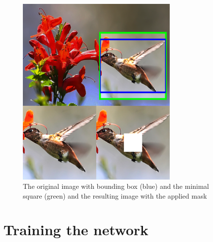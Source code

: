 \documentclass[conference]{IEEEtran}
\begin{document}
\begin{figure}[H]
  \centering
  \includegraphics[width=80mm, keepaspectratio]{figures/preparation.png}
  \caption{The original image with bounding box (blue) and the minimal square (green) and the resulting image with the applied mask}
  \label{fig:Preparation}
\end{figure}


\section{Training the network}
\end{document}
